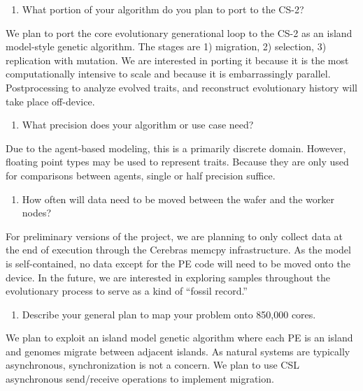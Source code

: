 \begin{enumerate}[resume] \itshape \bfseries
\item What portion of your algorithm do you plan to port to the CS-2?
\end{enumerate}
\noindent
We plan to port the core evolutionary generational loop to the CS-2 as an island model-style genetic algorithm.
The stages are 1) migration, 2) selection, 3) replication with mutation.
We are interested in porting it because it is the most computationally intensive to scale and because it is embarrassingly parallel.
Postprocessing to analyze evolved traits, and reconstruct evolutionary history will take place off-device.

\begin{enumerate}[resume] \itshape \bfseries
\item %
What precision does your algorithm or use case need?
\end{enumerate}
\noindent
Due to the agent-based modeling, this is a primarily discrete domain.
However, floating point types may be used to represent traits.
Because they are only used for comparisons between agents, single or half precision suffice.

\begin{enumerate}[resume] \itshape \bfseries
\item %
How often will data need to be moved between the wafer and the worker nodes?
\end{enumerate}
\noindent
For preliminary versions of the project, we are planning to only collect data at the end of execution through the Cerebras memcpy infrastructure.
As the model is self-contained, no data except for the PE code will need to be moved onto the device.
In the future, we are interested in exploring samples throughout the evolutionary process to serve as a kind of ``fossil record.''

\begin{enumerate}[resume] \itshape \bfseries
\item Describe your general plan to map your problem onto 850,000 cores. 
\end{enumerate}
\noindent
We plan to exploit an island model genetic algorithm where each PE is an island and genomes migrate between adjacent islands.
As natural systems are typically asynchronous, synchronization is not a concern.
We plan to use CSL asynchronous send/receive operations to implement migration.


